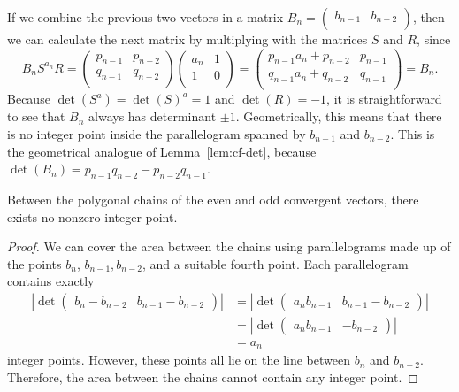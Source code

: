 If we combine the previous two vectors in a matrix $B_n = \begin{pmatrix}
  b_{n-1} & b_{n-2} \\
\end{pmatrix}$,
then we can calculate the next matrix by multiplying with the matrices $S$ and $R$, since
\[
  B_n S^{a_n} R =
  \begin{pmatrix}
    p_{n-1} & p_{n-2} \\
    q_{n-1} & q_{n-2} \\
  \end{pmatrix}
  \begin{pmatrix}
    a_n & 1 \\
    1   & 0 \\
  \end{pmatrix}
  =
  \begin{pmatrix}
    p_{n-1} a_n + p_{n-2} & p_{n-1} \\
    q_{n-1} a_n + q_{n-2} & q_{n-1} \\
  \end{pmatrix}
  =
  B_n.
\]
Because $\det(S^a) = \det(S)^a = 1$ and $\det(R) = -1$, it is straightforward to
see that $B_n$ always has determinant $±1$.
Geometrically, this means that there is no integer point inside the
parallelogram spanned by $b_{n-1}$ and $b_{n-2}$.
This is the geometrical analogue of Lemma~\ref{lem:cf-det},
because $\det(B_n) = p_{n-1} q_{n-2} - p_{n-2} q_{n-1}$.

\begin{lemma}
  \label{lem:klein-empty}
  Between the polygonal chains of the even and odd convergent vectors,
  there exists no nonzero integer point.
\end{lemma}

\begin{proof}
  We can cover the area between the chains
  using parallelograms made up of the points $b_n$, $b_{n-1}, b_{n-2}$, and a suitable fourth point.
  Each parallelogram contains exactly
  \begin{align*}
    \left|\det\begin{pmatrix}
      b_n - b_{n-2} & b_{n-1} - b_{n-2}
    \end{pmatrix}\right|
    & = \left|\det\begin{pmatrix}
      a_n b_{n-1} & b_{n-1} - b_{n-2}
    \end{pmatrix}\right| \\
    & = \left|\det\begin{pmatrix}
      a_n b_{n-1} & -b_{n-2}
    \end{pmatrix}\right| \\
    & = a_n
  \end{align*}
  integer points.
  However, these points all lie on the line between $b_n$ and $b_{n-2}$.
  Therefore, the area between the chains cannot contain any integer point.
\end{proof}

